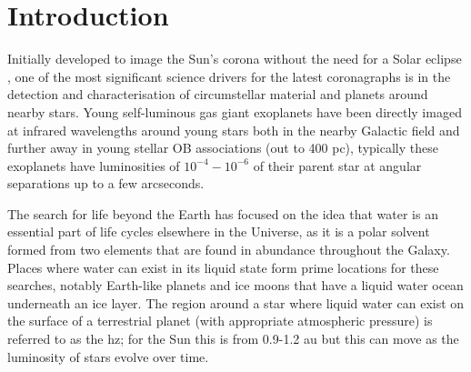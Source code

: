 \documentclass[letterpaper]{ar-1col}
\begin{document}
\tableofcontents

\section{Introduction}
\label{sec:intro}



Initially developed to image the Sun's corona without the need for a Solar eclipse \citep{Lyot33}, one of the most significant science drivers for the latest coronagraphs is in the detection and characterisation of circumstellar material and planets around nearby stars.
%
Young self-luminous gas giant exoplanets have been directly imaged at infrared wavelengths around young stars \citep[see ][ for a review of these detections]{Zurlo24} both in the nearby Galactic field and further away in young stellar OB associations (out to 400 pc), typically these exoplanets have luminosities of $10^{-4}-10^{-6}$ of their parent star at angular separations up to a few arcseconds. 

The search for life beyond the Earth has focused on the idea that water is an essential part of life cycles elsewhere in the Universe, as it is a polar solvent formed from two elements that are found in abundance throughout the Galaxy.
%
Places where water can exist in its liquid state form prime locations for these searches, notably Earth-like planets and ice moons that have a liquid water ocean underneath an ice layer.
%
The region around a star where liquid water can exist on the surface of a terrestrial planet (with appropriate atmospheric pressure) is referred to as the \ac{hz}; for the Sun this is from 0.9-1.2 au but this can move as the luminosity of stars evolve over time.
\end{document}
